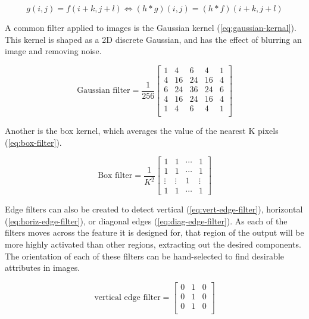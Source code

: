 \begin{equation}
    g(i,j) = f(i+k,j+l) \Longleftrightarrow (h*g)(i,j) = (h*f)(i+k,j+l)
    \label{eq:shift-invariance}
\end{equation}

A common filter applied to images is the Gaussian kernel (\cref{eq:gaussian-kernal}). This kernel is shaped as a 2D discrete Gaussian, and has the effect of blurring an image and removing noise.

\begin{equation}
    \text{Gaussian filter}=\frac{1}{256}\begin{bmatrix}
        1 & 4 & 6 & 4 & 1 \\
        4 & 16 & 24 & 16 & 4\\
        6 & 24 & 36 & 24 & 6\\
        4 & 16 & 24 & 16 & 4\\
        1 & 4 & 6 & 4 & 1 \\
    \end{bmatrix}
    \label{eq:gaussian-kernal}
\end{equation}

Another is the box kernel, which averages the value of the nearest K pixels (\cref{eq:box-filter}).

\begin{equation}
    \text{Box filter} = \frac{1}{K^{2}}\begin{bmatrix}
        1 & 1 & \cdots &1\\
        1 & 1 & \cdots &1 \\
        \vdots & \vdots & 1 & \vdots \\
        1 & 1 & \cdots & 1
    \end{bmatrix}
    \label{eq:box-filter}
\end{equation}

Edge filters can also be created to detect vertical (\cref{eq:vert-edge-filter}), horizontal (\cref{eq:horiz-edge-filter}), or diagonal edges (\cref{eq:diag-edge-filter}). As each of the filters moves across the feature it is designed for, that region of the output will be more highly activated than other regions, extracting out the desired components. The orientation of each of these filters can be hand-selected to find desirable attributes in images.

\begin{equation}
    \text{vertical edge filter} = \begin{bmatrix}
            0 & 1 & 0 \\
            0 & 1 & 0 \\
            0 & 1 & 0 \\
    \end{bmatrix}
    \label{eq:vert-edge-filter}
\end{equation}

